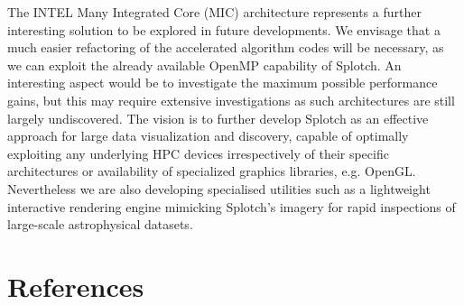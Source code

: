 \documentclass[1p]{elsarticle}
\begin{document}
The INTEL Many Integrated Core (MIC) architecture \cite{mic} represents a further interesting solution to be explored in future developments. We envisage that a much easier refactoring of the accelerated algorithm codes will be necessary, as we can exploit the already available OpenMP capability of Splotch. An interesting aspect would be to investigate the maximum possible performance gains, but this may require extensive investigations as such architectures are still largely undiscovered. The vision is to further develop Splotch as an effective approach for large data visualization and discovery, capable of optimally exploiting any underlying HPC devices irrespectively of their specific architectures or availability of specialized graphics libraries, e.g. OpenGL. Nevertheless we are also developing specialised utilities such as a lightweight interactive rendering engine mimicking Splotch's imagery for rapid inspections of large-scale astrophysical datasets.

\section{References}

	
\end{document}
